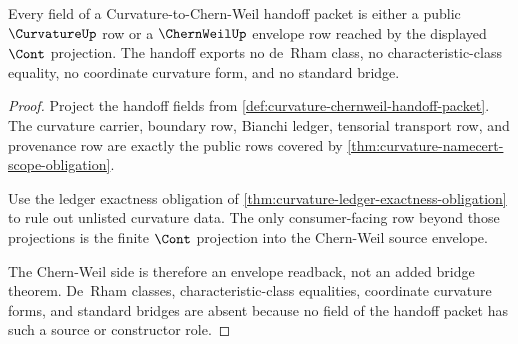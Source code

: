 \begin{theorem}
\label{thm:curvature-handoff-provenance-exactness}
Every field of a Curvature-to-Chern-Weil handoff packet is either a public $\CurvatureUp$ row or a $\ChernWeilUp$ envelope row reached by the displayed $\Cont$ projection. The handoff exports no de~Rham class, no characteristic-class equality, no coordinate curvature form, and no standard bridge.
\end{theorem}
\begin{proof}
Project the handoff fields from \autoref{def:curvature-chernweil-handoff-packet}. The curvature carrier, boundary row, Bianchi ledger, tensorial transport row, and provenance row are exactly the public rows covered by \autoref{thm:curvature-namecert-scope-obligation}.

Use the ledger exactness obligation of \autoref{thm:curvature-ledger-exactness-obligation} to rule out unlisted curvature data. The only consumer-facing row beyond those projections is the finite $\Cont$ projection into the Chern-Weil source envelope.

The Chern-Weil side is therefore an envelope readback, not an added bridge theorem. De~Rham classes, characteristic-class equalities, coordinate curvature forms, and standard bridges are absent because no field of the handoff packet has such a source or constructor role.
\end{proof}

